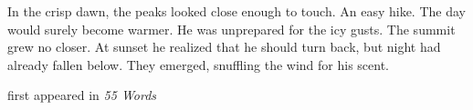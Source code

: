 In the crisp dawn, the peaks looked close enough to touch. An easy hike.
The day would surely become warmer. He was unprepared for the icy gusts.
The summit grew no closer. At sunset he realized that he should turn
back, but night had already fallen below. They emerged, snuffling the
wind for his scent.

first appeared in \emph{55 Words}
